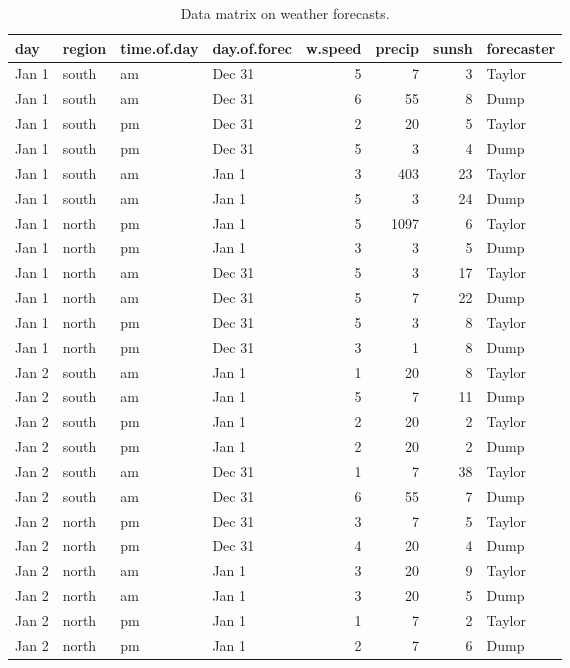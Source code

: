 \documentclass[]{book}\usepackage[]{graphicx}\usepackage[]{color}
\begin{document}
\begin{table}[ht]
\centering
\caption{Data matrix on weather forecasts.} 
\label{tab:data_5c}
\begin{tabular}{llllrrrl}
  \hline
day & region & time.of.day & day.of.forec & w.speed & precip & sunsh & forecaster \\ 
  \hline
Jan 1 & south & am & Dec 31 & 5 & 7 & 3 & Taylor \\ 
  Jan 1 & south & am & Dec 31 & 6 & 55 & 8 & Dump \\ 
  Jan 1 & south & pm & Dec 31 & 2 & 20 & 5 & Taylor \\ 
  Jan 1 & south & pm & Dec 31 & 5 & 3 & 4 & Dump \\ 
  Jan 1 & south & am & Jan 1 & 3 & 403 & 23 & Taylor \\ 
  Jan 1 & south & am & Jan 1 & 5 & 3 & 24 & Dump \\ 
  Jan 1 & north & pm & Jan 1 & 5 & 1097 & 6 & Taylor \\ 
  Jan 1 & north & pm & Jan 1 & 3 & 3 & 5 & Dump \\ 
  Jan 1 & north & am & Dec 31 & 5 & 3 & 17 & Taylor \\ 
  Jan 1 & north & am & Dec 31 & 5 & 7 & 22 & Dump \\ 
  Jan 1 & north & pm & Dec 31 & 5 & 3 & 8 & Taylor \\ 
  Jan 1 & north & pm & Dec 31 & 3 & 1 & 8 & Dump \\ 
  Jan 2 & south & am & Jan 1 & 1 & 20 & 8 & Taylor \\ 
  Jan 2 & south & am & Jan 1 & 5 & 7 & 11 & Dump \\ 
  Jan 2 & south & pm & Jan 1 & 2 & 20 & 2 & Taylor \\ 
  Jan 2 & south & pm & Jan 1 & 2 & 20 & 2 & Dump \\ 
  Jan 2 & south & am & Dec 31 & 1 & 7 & 38 & Taylor \\ 
  Jan 2 & south & am & Dec 31 & 6 & 55 & 7 & Dump \\ 
  Jan 2 & north & pm & Dec 31 & 3 & 7 & 5 & Taylor \\ 
  Jan 2 & north & pm & Dec 31 & 4 & 20 & 4 & Dump \\ 
  Jan 2 & north & am & Jan 1 & 3 & 20 & 9 & Taylor \\ 
  Jan 2 & north & am & Jan 1 & 3 & 20 & 5 & Dump \\ 
  Jan 2 & north & pm & Jan 1 & 1 & 7 & 2 & Taylor \\ 
  Jan 2 & north & pm & Jan 1 & 2 & 7 & 6 & Dump \\ 
   \hline
\end{tabular}
\end{table}
\end{document}
